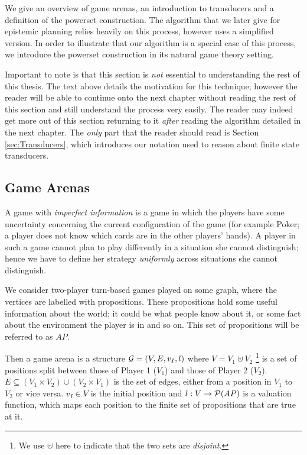 \documentclass[ %
                    author={Leo Poulson},
                supervisor={Dr. Steven Ramsay},
                    degree={BSc},
                     title={Epistemic Planning for the Dynamic Gossip problem},
                  subtitle={},
                      year={2019} ]{dissertation}
\begin{document}
We give an overview of game arenas, an introduction to transducers and
a definition of the powerset construction. The algorithm that we later give for
epistemic planning relies heavily on this process, however uses a simplified
version. In order to illustrate that our algorithm is a special case of this
process, we introduce the powerset construction in its natural game theory
setting. 

Important to note is that this section is \emph{not} essential to understanding
the rest of this thesis. The text above details the motivation for this
technique; however the reader will be able to continue onto the next chapter
without reading the rest of this section and still understand the process very
easily. The reader may indeed get more out of this section returning to it
\emph{after} reading the algorithm detailed in the next chapter. The \emph{only}
part that the reader should read is Section \ref{sec:Transducers}, which
introduces our notation used to reason about finite state transducers.

\subsection{Game Arenas}

A game with \emph{imperfect information} is a game in which the players have
some uncertainty concerning the current configuration of the game (for example
Poker; a player does not know which cards are in the other players' hands). A
player in such a game cannot plan to play differently in a situation she cannot
distinguish; hence we have to define her strategy \emph{uniformly} across
situations she cannot distinguish. 

We consider two-player turn-based games played on some graph, where the
vertices are labelled with propositions. These propositions hold some useful
information about the world; it could be what people know about it, or some fact
about the environment the player is in and so on. This set of propositions will
be referred to as $AP$. 

Then a game arena is a structure $\mathcal{G} = (V, E, v_I, l)$ where $V = V_1 \uplus
V_2$ \footnote{We use $\uplus$ here to indicate that the two sets are
  \emph{disjoint}.} is a set of positions split between those of Player 1
($V_1$) and those of Player 2 ($V_2$). $E \subseteq (V_1 \times V_2) \cup (V_2
\times V_1)$ is the set of edges, either from a position in $V_1$ to $V_2$ or
vice versa. $v_I \in V$ is the initial position and $l : V \rightarrow
\mathcal{P}(AP)$ is a valuation function, which maps each position to the finite set
of propositions that are true at it.
\end{document}
